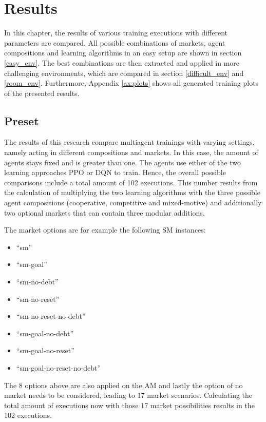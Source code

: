\chapter{Results}\label{sec:Results}
In this chapter, the results of various training executions with different parameters are compared. All possible combinations of markets, agent compositions and learning algorithms in an easy setup are shown in section \ref{easy_env}. The best combinations are then extracted and applied in more challenging environments, which are compared in section \ref{difficult_env} and \ref{room_env}. Furthermore, Appendix \ref{ax:plots} shows all generated training plots of the presented results.

\section{Preset} \label{setup}

The results of this research compare multiagent trainings with varying settings, namely acting in different compositions and markets. In this case, the amount of agents stays fixed and is greater than one. The agents use either of the two learning approaches PPO or DQN to train. Hence, the overall possible comparisons include a total amount of 102 executions. This number results from the calculation of multiplying the two learning algorithms with the three possible agent compositions (cooperative, competitive and mixed-motive) and additionally two optional markets that can contain three modular additions. 

The market options are for example the following SM instances: 
\begin{itemize}
    \item ``sm''
    \item ``sm-goal''
    \item ``sm-no-debt''
    \item ``sm-no-reset''
    \item ``sm-no-reset-no-debt''
    \item ``sm-goal-no-debt''
    \item ``sm-goal-no-reset''
    \item ``sm-goal-no-reset-no-debt''
\end{itemize}
The 8 options above are also applied on the AM and lastly the option of no market needs to be considered, leading to 17 market scenarios. Calculating the total amount of executions now with those 17 market possibilities results in the 102 executions.


